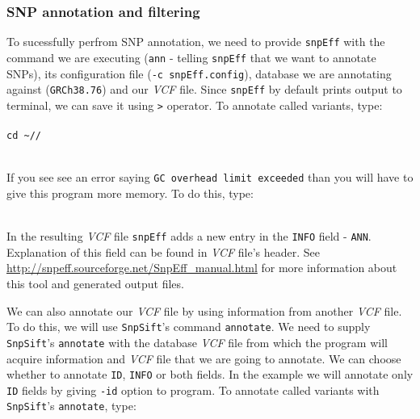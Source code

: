 
\subsubsection{SNP annotation and filtering}
To sucessfully perfrom SNP
annotation, we need to provide \texttt{snpEff} with the command we are executing 
(\texttt{ann} - telling \texttt{snpEff} that we want to annotate SNPs), its configuration file (\texttt{-c snpEff.config}),
database we are annotating against (\texttt{GRCh38.76}) and our \textit{VCF} file. Since \texttt{snpEff} by default prints
output to terminal, we can save it using \texttt{>} operator.
To annotate called variants, type:\\~\\
\texttt{cd \textasciitilde/\workDir/\reseqDir}\\
\\

\begin{framed}
If you see see an error saying \texttt{GC overhead limit exceeded} than you will have to give this
program more memory. To do this, type:\\~\\
\end{framed}
In the resulting \textit{VCF} file \texttt{snpEff} adds a new entry in the \texttt{INFO} field - \texttt{ANN}.
Explanation of this field can be found in \textit{VCF} file's header. See \url{http://snpeff.sourceforge.net/SnpEff_manual.html}
for more information about this tool and generated output files.

We can also annotate our \textit{VCF} file by using information from another \textit{VCF} file.
To do this, we will use \texttt{SnpSift}'s command \texttt{annotate}. 
We need to supply \texttt{SnpSift}'s \texttt{annotate} with the database \textit{VCF} file from which
the program will acquire information and \textit{VCF} file that we are going to annotate. We can
choose whether to annotate \texttt{ID}, \texttt{INFO} or both fields. In the example we will
annotate only \texttt{ID} fields by giving \texttt{-id} option to program.
To annotate called variants with \texttt{SnpSift}'s \texttt{annotate}, type:\\~\\
\\

